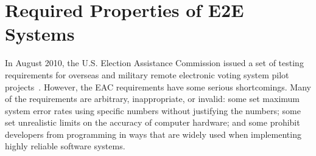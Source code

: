 \chapter{Required Properties of E2E Systems}
\label{chapter:required_properties}

In August 2010, the U.S. Election Assistance Commission issued a set
of testing requirements for overseas and military remote electronic
voting system pilot projects~\cite{eac-uocava2010}. However, the EAC
requirements have some serious shortcomings. Many of the requirements
are arbitrary, inappropriate, or invalid: some set maximum system
error rates using specific numbers without justifying the numbers;
some set unrealistic limits on the accuracy of computer hardware; and
some prohibit developers from programming in ways that are widely used
when implementing highly reliable software systems.

%


